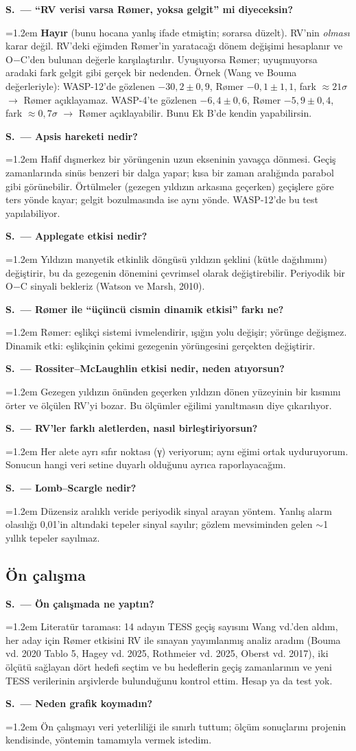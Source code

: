 \documentclass[11pt,a4paper]{article}
\newcounter{sor}[section]
\newcommand{\SC}[2]{\stepcounter{sor}\par\noindent\textbf{S\thesection.\thesor\ — #1}\par\nopagebreak
  \noindent\hangindent=1.2em\hangafter=0 #2\par\vspace{0.35em}}
\newcommand{\OC}{O$-$C}
\begin{document}
\SC{``RV verisi varsa Rømer, yoksa gelgit'' mi diyeceksin?}{\textbf{Hayır} (bunu hocana yanlış ifade etmiştin; sorarsa düzelt). RV'nin \emph{olması} karar değil. RV'deki eğimden Rømer'in yaratacağı dönem değişimi hesaplanır ve \OC{}'den bulunan değerle karşılaştırılır. Uyuşuyorsa Rømer; uyuşmuyorsa aradaki fark gelgit gibi gerçek bir nedenden. Örnek (Wang ve Bouma değerleriyle): WASP-12'de gözlenen $-30{,}2\pm0{,}9$, Rømer $-0{,}1\pm1{,}1$, fark $\approx21\sigma$ $\rightarrow$ Rømer açıklayamaz. WASP-4'te gözlenen $-6{,}4\pm0{,}6$, Rømer $-5{,}9\pm0{,}4$, fark $\approx0{,}7\sigma$ $\rightarrow$ Rømer açıklayabilir. Bunu Ek B'de kendin yapabilirsin.}
\SC{Apsis hareketi nedir?}{Hafif dışmerkez bir yörüngenin uzun ekseninin yavaşça dönmesi. Geçiş zamanlarında sinüs benzeri bir dalga yapar; kısa bir zaman aralığında parabol gibi görünebilir. Örtülmeler (gezegen yıldızın arkasına geçerken) geçişlere göre ters yönde kayar; gelgit bozulmasında ise aynı yönde. WASP-12'de bu test yapılabiliyor.}
\SC{Applegate etkisi nedir?}{Yıldızın manyetik etkinlik döngüsü yıldızın şeklini (kütle dağılımını) değiştirir, bu da gezegenin dönemini çevrimsel olarak değiştirebilir. Periyodik bir \OC{} sinyali bekleriz (Watson ve Marsh, 2010).}
\SC{Rømer ile ``üçüncü cismin dinamik etkisi'' farkı ne?}{Rømer: eşlikçi sistemi ivmelendirir, ışığın yolu değişir; yörünge değişmez. Dinamik etki: eşlikçinin çekimi gezegenin yörüngesini gerçekten değiştirir.}
\SC{Rossiter--McLaughlin etkisi nedir, neden atıyorsun?}{Gezegen yıldızın önünden geçerken yıldızın dönen yüzeyinin bir kısmını örter ve ölçülen RV'yi bozar. Bu ölçümler eğilimi yanıltmasın diye çıkarılıyor.}
\SC{RV'ler farklı aletlerden, nasıl birleştiriyorsun?}{Her alete ayrı sıfır noktası (γ) veriyorum; aynı eğimi ortak uyduruyorum. Sonucun hangi veri setine duyarlı olduğunu ayrıca raporlayacağım.}
\SC{Lomb--Scargle nedir?}{Düzensiz aralıklı veride periyodik sinyal arayan yöntem. Yanlış alarm olasılığı 0,01'in altındaki tepeler sinyal sayılır; gözlem mevsiminden gelen $\sim$1 yıllık tepeler sayılmaz.}

\subsection{Ön çalışma}
\SC{Ön çalışmada ne yaptın?}{Literatür taraması: 14 adayın TESS geçiş sayısını Wang vd.'den aldım, her aday için Rømer etkisini RV ile sınayan yayımlanmış analiz aradım (Bouma vd. 2020 Tablo 5, Hagey vd. 2025, Rothmeier vd. 2025, Oberst vd. 2017), iki ölçütü sağlayan dört hedefi seçtim ve bu hedeflerin geçiş zamanlarının ve yeni TESS verilerinin arşivlerde bulunduğunu kontrol ettim. Hesap ya da test yok.}
\SC{Neden grafik koymadın?}{Ön çalışmayı veri yeterliliği ile sınırlı tuttum; ölçüm sonuçlarını projenin kendisinde, yöntemin tamamıyla vermek istedim.}
\end{document}

